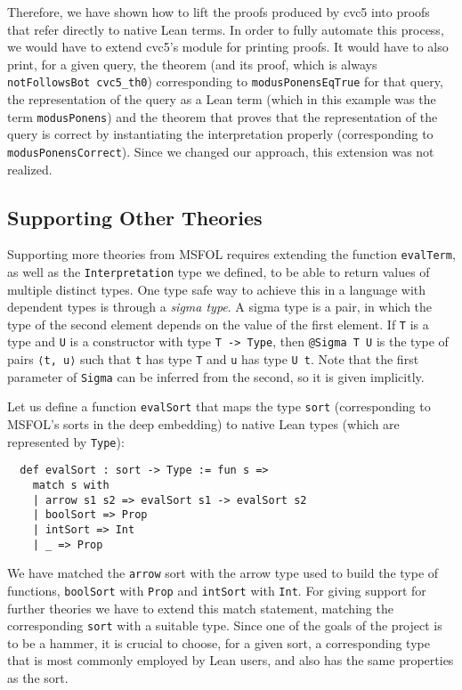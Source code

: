 Therefore, we have shown how to lift the proofs produced by cvc5 into proofs
that refer directly to native Lean terms. In order to fully automate this
process, we would have to extend cvc5's module for printing proofs. It would
have to also print, for a given query, the theorem (and its proof, which is always
\texttt{notFollowsBot cvc5\_th0}) corresponding to \texttt{modusPonensEqTrue} for that query,
the representation of the query as a Lean term (which in this example was the term \texttt{modusPonens})
and the theorem that proves that the representation of the query is correct by instantiating the interpretation
properly (corresponding to \texttt{modusPonensCorrect}).
Since we changed our approach, this extension was not realized.

\subsection{Supporting Other Theories}

Supporting more theories from MSFOL requires extending the function \texttt{evalTerm},
as well as the \texttt{Interpretation} type we defined, to be able to return values
of multiple distinct types. One type safe way to achieve this in a language with
dependent types is through a \textit{sigma type}. A sigma type is a pair, in which
the type of the second element depends on the value of the first element. If
\texttt{T} is a type and \texttt{U} is a constructor with type
\texttt{T -> Type}, then \texttt{@Sigma T U} is the type
of pairs \texttt{⟨t, u⟩} such that \texttt{t} has type \texttt{T} and
\texttt{u} has type \texttt{U t}. Note that the first parameter of \texttt{Sigma}
can be inferred from the second, so it is given implicitly.

Let us define a function \texttt{evalSort} that maps the type \texttt{sort}
(corresponding to MSFOL's sorts in the deep embedding) to native Lean types
(which are represented by \texttt{Type}):

\begin{verbatim}
  def evalSort : sort -> Type := fun s =>
    match s with
    | arrow s1 s2 => evalSort s1 -> evalSort s2
    | boolSort => Prop
    | intSort => Int
    | _ => Prop
\end{verbatim}

We have matched the \texttt{arrow} sort with the arrow type used to build the type of
functions, \texttt{boolSort} with \texttt{Prop} and \texttt{intSort} with \texttt{Int}.
For giving support for further theories we have to extend this match statement,
matching the corresponding \texttt{sort} with a suitable type. Since one of the goals
of the project is to be a hammer, it is crucial to choose, for a given sort,
a corresponding type that is most commonly employed by Lean users, and also
has the same properties as the sort.

